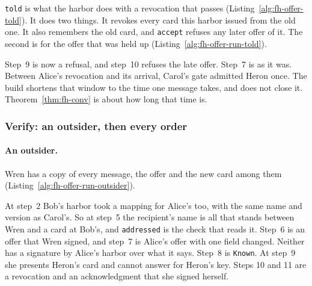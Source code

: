 \texttt{told} is what the harbor does with a revocation that passes
(Listing~\ref{alg:fh-offer-told}). It does two things. It revokes every
card this harbor issued from the old one. It also remembers the old card,
and \texttt{accept} refuses any later offer of it. The second is for the
offer that was held up (Listing~\ref{alg:fh-offer-run-told}).



Step~9 is now a refusal, and step~10 refuses the late offer. Step~7 is as
it was. Between Alice's revocation and its arrival, Carol's gate admitted
Heron once. The build shortens that window to the time one message takes,
and does not close it. Theorem~\ref{thm:fh-conv} is about how long that
time is.

\subsubsection{Verify: an outsider, then every order}

\paragraph{An outsider.}
Wren has a copy of every message, the offer and the new card among them
(Listing~\ref{alg:fh-offer-run-outsider}).


At step~2 Bob's harbor took a mapping for Alice's too, with the same name
and version as Carol's. So at step~5 the recipient's name is all that
stands between Wren and a card at Bob's, and \texttt{addressed} is the
check that reads it. Step~6 is an offer that Wren signed, and step~7 is
Alice's offer with one field changed. Neither has a signature by Alice's
harbor over what it says. Step~8 is \texttt{Known}. At step~9 she
presents Heron's card and cannot answer for Heron's key. Steps 10 and 11
are a revocation and an acknowledgment that she signed herself.

